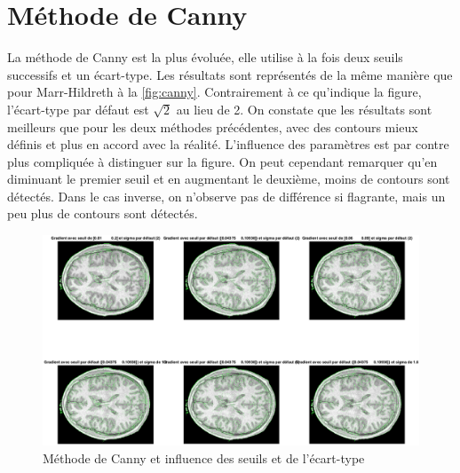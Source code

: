 \documentclass[12pt]{article}
\begin{document}
\section{Méthode de Canny}
La méthode de Canny est la plus évoluée, elle utilise à la fois deux seuils successifs et un écart-type. Les résultats sont représentés de la même manière que pour Marr-Hildreth à la \autoref{fig:canny}. Contrairement à ce qu'indique la figure, l'écart-type par défaut est $\sqrt{2}$ au lieu de 2. On constate que les résultats sont meilleurs que pour les deux méthodes précédentes, avec des contours mieux définis et plus en accord avec la réalité. L'influence des paramètres est par contre plus compliquée à distinguer sur la figure. On peut cependant remarquer qu'en diminuant le premier seuil et en augmentant le deuxième, moins de contours sont détectés. Dans le cas inverse, on n'observe pas de différence si flagrante, mais un peu plus de contours sont détectés.

\begin{figure}[!h]
  \centering
  \includegraphics[width = \textwidth]{canny}
  \caption{Méthode de Canny et influence des seuils et de l'écart-type}
  \label{fig:canny}
\end{figure}
\end{document}

